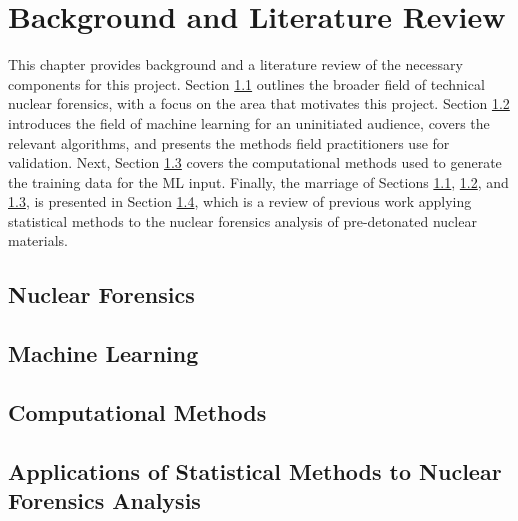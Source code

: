 \chapter{Background and Literature Review}
\label{ch:litrev}

This chapter provides background and a literature review of the necessary
components for this project. Section \ref{sec:nfoverview} outlines the broader
field of technical nuclear forensics, with a focus on the area that motivates
this project.  Section \ref{sec:mlback} introduces the field of machine
learning for an uninitiated audience, covers the relevant algorithms, and
presents the methods field practitioners use for validation. Next, Section
\ref{sec:fcsim} covers the computational methods used to generate the training
data for the \gls{ML} input. Finally, the marriage of Sections
\ref{sec:nfoverview}, \ref{sec:mlback}, and \ref{sec:fcsim}, is presented in
Section \ref{sec:stats4nf}, which is a review of previous work applying
statistical methods to the nuclear forensics analysis of pre-detonated nuclear
materials. 

\section{Nuclear Forensics}
\label{sec:nfoverview}


\section{Machine Learning}
\label{sec:mlback}


\section{Computational Methods}
\label{sec:fcsim}


\section{Applications of Statistical Methods to Nuclear Forensics Analysis}
\label{sec:stats4nf}


